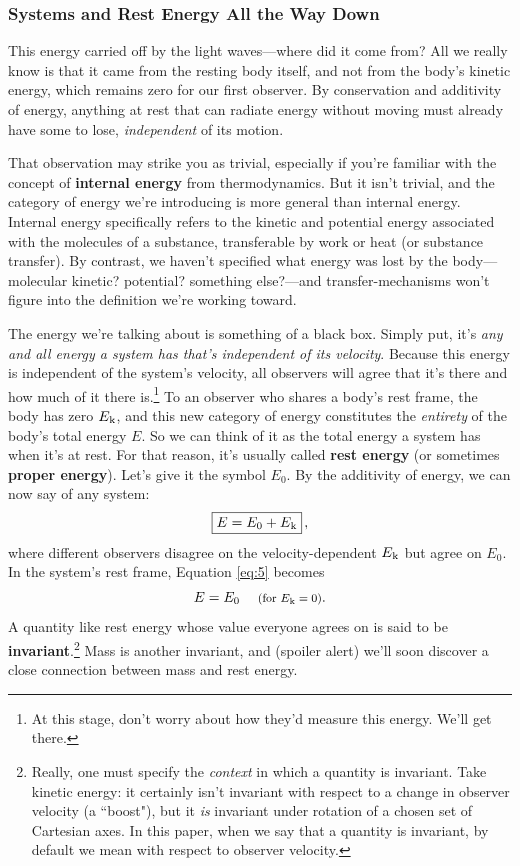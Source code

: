\documentclass[12pt]{article}
\begin{document}
\subsubsection{Systems and Rest Energy All the Way Down}\label{sssec:sy}

This energy carried off by the light waves---where did it come from? All we really know is that it came from the resting body itself, and not from the body's kinetic energy, which remains zero for our first observer. By conservation and additivity of energy, anything at rest that can radiate energy without moving must already have some to lose, \emph{independent} of its motion.

That observation may strike you as trivial, especially if you're familiar with the concept of \textbf{internal energy} from thermodynamics. But it isn't trivial, and the category of energy we're introducing is more general than internal energy. Internal energy specifically refers to the kinetic and potential energy associated with the molecules of a substance, transferable by work or heat (or substance transfer). By contrast, we haven't specified what energy was lost by the body---molecular kinetic? potential? something else?---and transfer-mechanisms won't figure into the definition we're working toward.

The energy we're talking about is something of a black box. Simply put, it's \emph{any and all energy a system has that's independent of its velocity}. Because this energy is independent of the system's velocity, all observers will agree that it's there and how much of it there is.\footnote{\label{fn:re}At this stage, don't worry about how they'd measure this energy. We'll get there.} To an observer who shares a body's rest frame, the body has zero $E_{\mkern.5mu \textrm{k}}$, and this new category of energy constitutes the \emph{entirety} of the body's total energy $E$. So we can think of it as the total energy a system has when it's at rest. For that reason, it's usually called \textbf{rest energy} (or sometimes \textbf{proper energy}). Let's give it the symbol $E_0$. By the additivity of energy, we can now say of any system:
\begin{equation}\label{eq:5}
\boxed{E=E_0+E_{\mkern.5mu \textrm{k}}} \, ,
\end{equation}
where different observers disagree on the velocity-dependent $E_{\mkern.5mu \textrm{k}}$ but agree on $E_0$. In the system's rest frame, Equation \ref{eq:5} becomes
\begin{equation}\label{eq:6}
E=E_0 \quad \textrm{\footnotesize{ (for $E_{\mkern.5mu \textrm{k}}=0$)}}.
\end{equation}
A quantity like rest energy whose value everyone agrees on is said to be \textbf{invariant}.\footnote{\label{fn:inv}Really, one must specify the \emph{context} in which a quantity is invariant. Take kinetic energy: it certainly isn't invariant with respect to a change in observer velocity (a ``boost"), but it \emph{is} invariant under rotation of a chosen set of Cartesian axes. In this paper, when we say that a quantity is invariant, by default we mean with respect to observer velocity.} Mass is another invariant, and (spoiler alert) we'll soon discover a close connection between mass and rest energy.
\end{document}
